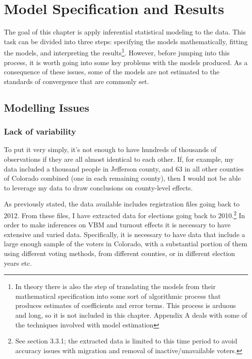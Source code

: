 \documentclass[12pt,twoside]{reedthesis}
\begin{document}
  \chapter{Model Specification and
  Results}\label{model-specification-and-results}
  
  The goal of this chapter is apply inferential statistical modeling to
  the data. This task can be divided into three steps: specifying the
  models mathematically, fitting the models, and interpreting the
  results\footnote{In theory there is also the step of translating the
    models from their mathematical specification into some sort of
    algorithmic process that produces estimates of coefficients and error
    terms. This process is arduous and long, so it is not included in this
    chapter. Appendix A deals with some of the techniques involved with
    model estimation}. However, before jumping into this process, it is
  worth going into some key problems with the models produced. As a
  consequence of these issues, some of the models are not estimated to the
  standards of convergence that are commonly set.
  
  \section{Modelling Issues}\label{modelling-issues}
  
  \subsection{Lack of variability}\label{lack-of-variability}
  
  To put it very simply, it's not enough to have hundreds of thousands of
  observations if they are all almost identical to each other. If, for
  example, my data included a thousand people in Jefferson county, and 63
  in all other counties of Colorado combined (one in each remaining
  county), then I would not be able to leverage my data to draw
  conclusions on county-level effects.
  
  As previously stated, the data available includes registration files
  going back to 2012. From these files, I have extracted data for
  elections going back to 2010.\footnote{See section 3.3.1; the extracted
    data is limited to this time period to avoid accuracy issues with
    migration and removal of inactive/unavailable voters.} In order to
  make inferences on VBM and turnout effects it is necessary to have
  extensive and varied data. Specifically, it is necessary to have data
  that include a large enough sample of the voters in Colorado, with a
  substantial portion of them using different voting methods, from
  different counties, or in different election years etc.
  
\end{document}
